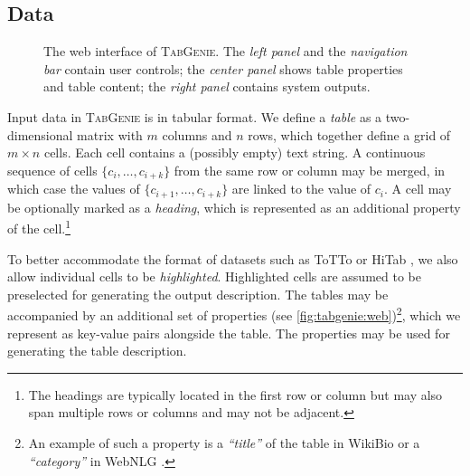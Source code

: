\subsection{Data}
\label{sec:tabgenie:data}

\begin{figure}[t]
    \centering
    \setlength{\fboxsep}{0pt}
    \caption{The web interface of \textsc{TabGenie}. The \emph{left panel} and the \emph{navigation bar} contain user controls; the \emph{center panel} shows table properties and table content; the \emph{right panel} contains system outputs.}
    \label{fig:tabgenie:web}
\end{figure}
Input data in \textsc{TabGenie} is in tabular format. We define a \textit{table} as a two-dimensional matrix with $m$ columns and $n$ rows, which together define a grid of $m \times n$ cells. Each cell contains a (possibly empty) text string. A continuous sequence of cells $\{c_{i}, \ldots, c_{i+k}\}$ from the same row or column may be merged, in which case the values of $\{c_{i+1},\ldots,c_{i+k}\}$ are linked to the value of $c_{i}$.  A cell may be optionally marked as a \textit{heading}, which is represented as an additional property of the cell.\footnote{The headings are typically located in the first row or column but may also span multiple rows or columns and may not be adjacent.}

To better accommodate the format of datasets such as ToTTo \cite{parikhToTToControlledTableToText2020} or HiTab \cite{chengHiTabHierarchicalTable2021}, we also allow individual cells to be \textit{highlighted}. Highlighted cells are assumed to be preselected for generating the output description. The tables may be accompanied by an additional set of properties (see \autoref{fig:tabgenie:web})\footnote{An example of such a property is a \textit{``title''} of the table in WikiBio \cite{lebretNeuralTextGeneration2016} or a \textit{``category''} in WebNLG \cite{gardentWebNLGChallengeGenerating2017}.}, which we represent as key-value pairs alongside the table. The properties may be used for generating the table description.

